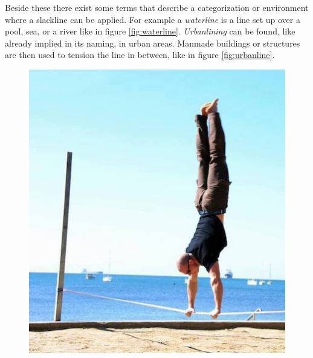 Beside these there exist some terms that describe a categorization or environment where a slackline can be applied. For example a \textit{waterline} is a line set up over a pool, sea, or a river like in figure \ref{fig:waterline}. \textit{Urbanlining} can be found, like already implied in its naming, in urban areas. Manmade buildings or structures are then used to tension the line in between, like in figure \ref{fig:urbanline}.
\begin{figure}[htb]
	\centering
	\begin{minipage}[t]{0.45\linewidth}
		\centering
		\includegraphics[width=1\linewidth]{Pictures/3_1_trickline}
		\label{fig:trickline}
	\end{minipage}
	\hfill
	\begin{minipage}[t]{0.45\linewidth}
		\centering

\end{minipage}
\end{figure}
